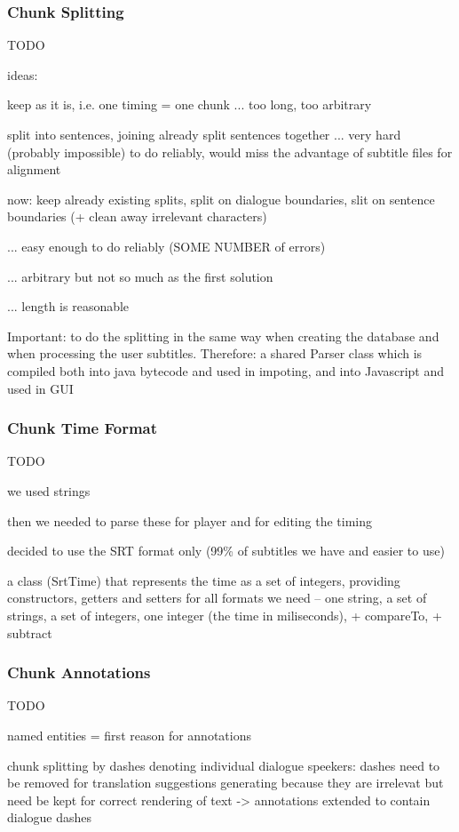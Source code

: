 \subsubsection{Chunk Splitting}

TODO

ideas:

keep as it is, i.e. one timing = one chunk ... too long, too arbitrary

split into sentences, joining already split sentences together ... very hard (probably impossible) to do reliably, would miss the advantage of subtitle files for alignment

now: keep already existing splits, split on dialogue boundaries, slit on sentence boundaries (+ clean away irrelevant characters)

... easy enough to do reliably (SOME NUMBER of errors)

... arbitrary but not so much as the first solution

... length is reasonable

Important: to do the splitting in the same way when creating the database and when processing the user subtitles.
Therefore: a shared Parser class which is compiled both into java bytecode and used in impoting, and into Javascript and used in GUI

\subsubsection{Chunk Time Format}

TODO

we used strings

then we needed to parse these for player and for editing the timing

decided to use the SRT format only (99\% of subtitles we have and easier to use)

a class (SrtTime) that represents the time as a set of integers, providing constructors, getters and setters for all formats we need -- one string, a set of strings, a set of integers, one integer (the time in miliseconds), + compareTo, + subtract

\subsubsection{Chunk Annotations}

TODO

named entities = first reason for annotations

chunk splitting by dashes denoting individual dialogue speekers: dashes need to be removed for translation suggestions generating because they are irrelevat but need be kept for correct rendering of text -> annotations extended to contain dialogue dashes

